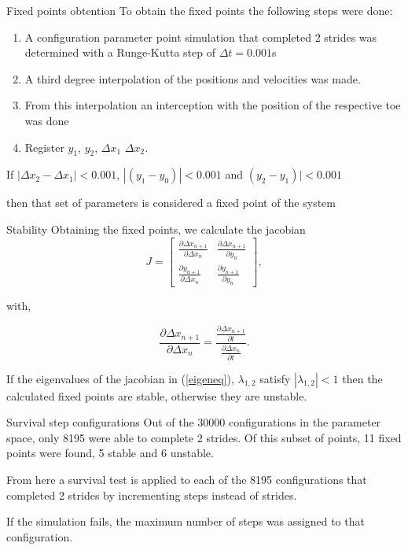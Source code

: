 \documentclass{beamer}
\begin{document}
\begin{frame}{Fixed points obtention}
  To obtain the fixed points the following steps were done:
  \begin{enumerate}
    \item A configuration parameter point simulation that completed 2 strides was determined  with a Runge-Kutta step of $\Delta t= 0.001$s
 \item A third degree interpolation of the positions and velocities was made.
 \item From this interpolation an interception with the position of the respective toe was done
 \item Register $y_1$, $y_2$, $\Delta x_1$ $\Delta x_2$.
  \end{enumerate}
  
  If  $|\Delta x_2-\Delta x_1|< 0.001$, $|(y_1-y_0)|<0.001$ and $(y_2-y_1)|<0.001$

  then that set of parameters is considered a fixed point of the system 
\end{frame}

\begin{frame}{Stability}
  Obtaining the fixed points, we calculate the jacobian
  \begin{equation}
 J= \begin{bmatrix}
    \frac{\partial \Delta x_{n+1}}{\partial \Delta x_{n}} & \frac{\partial \Delta x_{n+1}}{\partial  y_{n}}\\
     \frac{\partial  y_{n+1}}{\partial \Delta x_{n}} & \frac{\partial y_{n+1}}{\partial  y_{n}}
  \end{bmatrix},
  \label{eigeneq}
  \end{equation}

  with,

  \begin{equation}
    \frac{\partial \Delta x_{n+1}}{\partial \Delta x_{n}}=  \frac{\frac{\partial \Delta x_{n+1}}{\partial t}}{\frac{\partial \Delta x_{n}}{\partial t}}. 
  \end{equation}

  If the eigenvalues of the jacobian in (\ref{eigeneq}), $\lambda_{1,2}$ satisfy $|\lambda_{1,2}|<1$ then the calculated fixed points are stable, otherwise they are unstable.
\end{frame}

\begin{frame}{Survival step configurations}
  Out of the 30000 configurations in the parameter space, only 8195 were able to complete 2 strides. Of this subset of points, 11 fixed points were found, 5 stable and 6 unstable.
  
  From here a survival test is applied to each of the 8195 configurations that completed 2 strides by incrementing steps instead of strides.

  If the simulation fails, the maximum number of steps was assigned to that configuration.
\end{frame}
\end{document}
